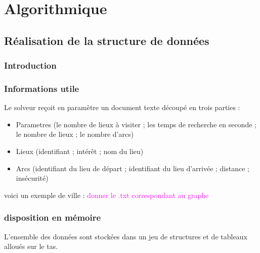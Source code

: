 \setcounter{chapter}{0}
\part{Algorithmique}


\chapter{Réalisation de la structure de données}

  \section{Introduction}

  \section{Informations utile}
    Le solveur reçoit en paramètre un document texte découpé en trois parties :
    \begin{itemize}
      \item Parametres (le nombre de lieux à visiter ; les temps de recherche en seconde ; le nombre de lieux ; le nombre d'arcs)
      \item Lieux (identifiant ; intérêt ; nom du lieu)
      \item Arcs (identifiant du lieu de départ ; identifiant du lieu d'arrivée ; distance ; insécurité)
    \end{itemize}

    voici un exemple de ville : \textcolor{magenta}{donner le .txt correspondant au graphe}

  \section{disposition en mémoire}
    L'ensemble des données sont stockées dans un jeu de structures et de tableaux alloués sur le tas.

